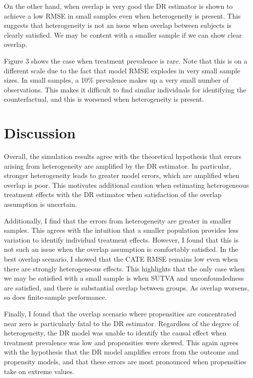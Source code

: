\documentclass[12pt, oneside]{article}   	%
\begin{document}
On the other hand, when overlap is very good the DR estimator is shown to achieve a low RMSE in small samples even when heterogeneity is present. This suggests that heterogeneity is not an issue when overlap between subjects is clearly satisfied. We may be content with a smaller sample if we can show clear overlap.

Figure 3 shows the case when treatment prevalence is rare. Note that this is on a different scale due to the fact that model RMSE explodes in very small sample sizes. In small samples, a 10\% prevalence makes up a very small number of observations. This makes it difficult to find similar individuals for identifying the counterfactual, and this is worsened when heterogeneity is present.

\section{Discussion}

Overall, the simulation results agree with the theoretical hypothesis that errors arising from heterogeneity are amplified by the DR estimator. In particular, stronger heterogeneity leads to greater model errors, which are amplified when overlap is poor. This motivates additional caution when estimating heterogeneous treatment effects with the DR estimator when satisfaction of the overlap assumption is uncertain.

Additionally, I find that the errors from heterogeneity are greater in smaller samples. This agrees with the intuition that a smaller population provides less variation to identify individual treatment effects. However, I found that this is not such an issue when the overlap assumption is comfortably satisfied. In the best overlap scenario, I showed that the CATE RMSE remains low even when there are strongly heterogeneous effects. This highlights that the only case when we may be satisfied with a small sample is when SUTVA and unconfoundedness are satisfied, and there is substantial overlap between groups. As overlap worsens, so does finite-sample performance.

Finally, I found that the overlap scenario where propensities are concentrated near zero is particularly fatal to the DR estimator. Regardless of the degree of heterogeneity, the DR model was unable to identify the causal effect when treatment prevalence was low and propensities were skewed. This again agrees with the hypothesis that the DR model amplifies errors from the outcome and propensity models, and that these errors are most pronounced when propensities take on extreme values.
\end{document}
